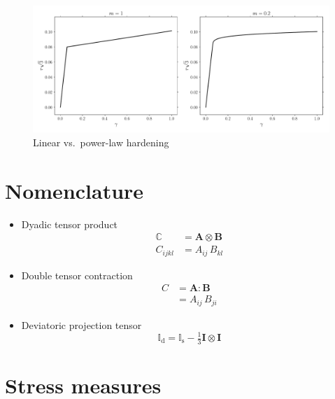 \documentclass[times,namecite]{goose-article}
\begin{document}
\begin{figure}[htp]
  \centering
  \includegraphics[width=1.\textwidth]{example}
  \caption{Linear vs.\ power-law hardening}
  \label{eq:powerlaw}
\end{figure}


\appendix
\vfill\newpage

\section{Nomenclature}
\label{sec:ap:nomenclature}


\begin{itemize}
%
\item Dyadic tensor product
\begin{align}
  \mathbb{C} &= \bm{A} \otimes \bm{B} \\
  C_{ijkl}   &= A_{ij} \,      B_{kl}
\end{align}
%
\item Double tensor contraction
\begin{align}
  C &= \bm{A} : \bm{B} \\
    &= A_{ij} \, B_{ji}
\end{align}
%
\item Deviatoric projection tensor
%
\begin{equation}
  \mathbb{I}_\mathrm{d}
  = \mathbb{I}_\mathrm{s} - \tfrac{1}{3} \bm{I} \otimes \bm{I}
\end{equation}
%
\end{itemize}


\section{Stress measures}
\label{sec:ap:stress}
\end{document}
